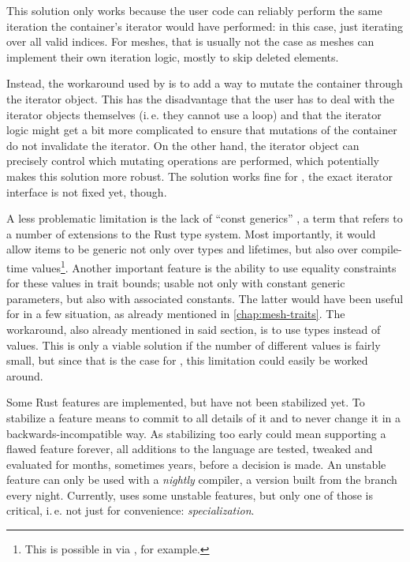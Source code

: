 This solution only works because the user code can reliably perform the same iteration the container's iterator would have performed: in this case, just iterating over all valid indices.
For meshes, that is usually not the case as meshes can implement their own iteration logic, mostly to skip deleted elements.

Instead, the workaround used by  is to add a way to mutate the container through the iterator object.
This has the disadvantage that the user has to deal with the iterator objects themselves (i.\,e. they cannot use a  loop) and that the iterator logic might get a bit more complicated to ensure that mutations of the container do not invalidate the iterator.
On the other hand, the iterator object can precisely control which mutating operations are performed, which potentially makes this solution more robust.
The solution works fine for , the exact iterator interface is not fixed yet, though.

\newpage

A less problematic limitation is the lack of \enquote{const generics} \cite{rfc2000}, a term that refers to a number of extensions to the Rust type system.
Most importantly, it would allow items to be generic not only over types and lifetimes, but also over compile-time values\footnote{This is possible in \cpp via , for example.}.
Another important feature is the ability to use equality constraints for these values in trait bounds; usable not only with constant generic parameters, but also with associated constants.
The latter would have been useful for  in a few situation, as already mentioned in \autoref{chap:mesh-traits}.
The workaround, also already mentioned in said section, is to use types instead of values.
This is only a viable solution if the number of different values is fairly small, but since that is the case for , this limitation could easily be worked around.

\vfill

Some Rust features are implemented, but have not been stabilized yet.
To stabilize a feature means to commit to all details of it and to never change it in a backwards-incompatible way.
As stabilizing too early could mean supporting a flawed feature forever, all additions to the language are tested, tweaked and evaluated for months, sometimes years, before a decision is made.
An unstable feature can only be used with a \emph{nightly} compiler, a version built from the  branch every night.
Currently,  uses some unstable features, but only one of those is critical, i.\,e. not just for convenience: \emph{specialization}.

